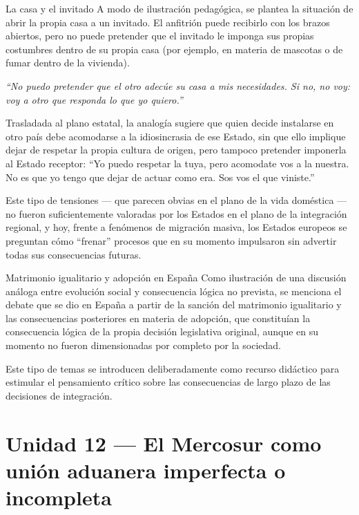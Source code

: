 \documentclass[12pt,oneside]{book}
\begin{document}
\begin{example}{La casa y el invitado}
A modo de ilustración pedagógica, se plantea la situación de abrir la propia casa a un invitado. El anfitrión puede recibirlo con los brazos abiertos, pero no puede pretender que el invitado le imponga sus propias costumbres dentro de su propia casa (por ejemplo, en materia de mascotas o de fumar dentro de la vivienda).

\textit{``No puedo pretender que el otro adecúe su casa a mis necesidades. Si no, no voy: voy a otro que responda lo que yo quiero.''}

Trasladada al plano estatal, la analogía sugiere que quien decide instalarse en otro país debe acomodarse a la idiosincrasia de ese Estado, sin que ello implique dejar de respetar la propia cultura de origen, pero tampoco pretender imponerla al Estado receptor: ``Yo puedo respetar la tuya, pero acomodate vos a la nuestra. No es que yo tengo que dejar de actuar como era. Sos vos el que viniste.''
\end{example}

Este tipo de tensiones --- que parecen obvias en el plano de la vida doméstica --- no fueron suficientemente valoradas por los Estados en el plano de la integración regional, y hoy, frente a fenómenos de migración masiva, los Estados europeos se preguntan cómo ``frenar'' procesos que en su momento impulsaron sin advertir todas sus consecuencias futuras.

\begin{example}{Matrimonio igualitario y adopción en España}
Como ilustración de una discusión análoga entre evolución social y consecuencia lógica no prevista, se menciona el debate que se dio en España a partir de la sanción del matrimonio igualitario y las consecuencias posteriores en materia de adopción, que constituían la consecuencia lógica de la propia decisión legislativa original, aunque en su momento no fueron dimensionadas por completo por la sociedad.
\end{example}

\begin{note}
Este tipo de temas se introducen deliberadamente como recurso didáctico para estimular el pensamiento crítico sobre las consecuencias de largo plazo de las decisiones de integración.
\end{note}

\section{Unidad 12 --- El Mercosur como unión aduanera imperfecta o incompleta}
\end{document}
